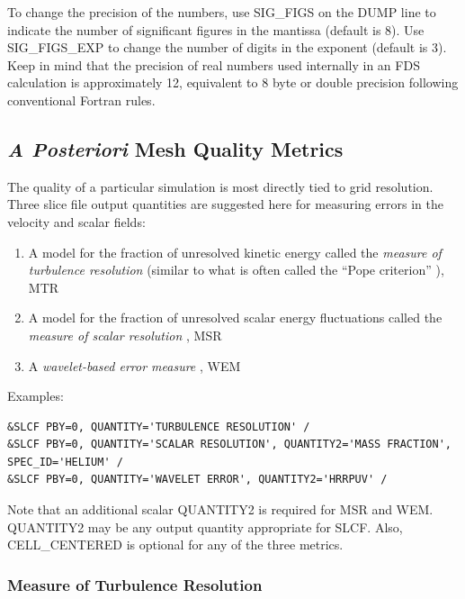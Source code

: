 \documentclass[11pt]{book}
\begin{document}
\noindent
To change the precision of the numbers, use {\ct SIG\_FIGS} on the {\ct DUMP} line to indicate the number of significant figures in the mantissa (default is 8). Use
{\ct SIG\_FIGS\_EXP} to change the number of digits in the exponent (default is 3). Keep in mind that the precision of real numbers used internally in an FDS calculation
is approximately 12, equivalent to 8 byte or double precision following conventional Fortran rules.


\subsection{\emph{A Posteriori} Mesh Quality Metrics}
\label{info:meshquality}
The quality of a particular simulation is most directly tied to grid resolution.  Three slice file output quantities are suggested here for measuring errors in the velocity and scalar fields:
\begin{enumerate}
\item A model for the fraction of unresolved kinetic energy called the \emph{measure of turbulence resolution} (similar to what is often called the ``Pope criterion'' \cite{Pope:2004}), MTR
\item A model for the fraction of unresolved scalar energy fluctuations called the \emph{measure of scalar resolution} \cite{Vervisch:2010}, MSR
\item A \emph{wavelet-based error measure} \cite{McDermott:2010}, WEM
\end{enumerate}

\noindent Examples:

\begin{lstlisting}
&SLCF PBY=0, QUANTITY='TURBULENCE RESOLUTION' /
&SLCF PBY=0, QUANTITY='SCALAR RESOLUTION', QUANTITY2='MASS FRACTION', SPEC_ID='HELIUM' /
&SLCF PBY=0, QUANTITY='WAVELET ERROR', QUANTITY2='HRRPUV' /
\end{lstlisting}
Note that an additional scalar {\ct QUANTITY2} is required for MSR and WEM.  {\ct QUANTITY2} may be any output quantity appropriate for {\ct SLCF}.
Also, {\ct CELL\_CENTERED} is optional for any of the three metrics.

\subsubsection{Measure of Turbulence Resolution}
\end{document}
